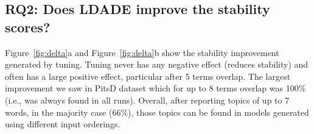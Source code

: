\documentclass[twocolumn,5p,sort&compress]{elsarticle}
\theoremstyle{break}
\begin{document}
\subsection{\textbf{RQ2: Does LDADE improve the stability scores?}}\label{sect:stable}

 Figure~\ref{fig:delta}a and Figure~\ref{fig:delta}b show the stability improvement
 generated by tuning.
   Tuning never
  has any negative effect (reduces stability) and often has a large positive effect,
  particular  after 5 terms overlap.
   The largest improvement  we
   saw  in PitsD dataset which for up to 8 terms overlap was 100\% (i.e., was always
   found in all runs).
   Overall, after reporting topics of up to 7 words, in the majority case (66\%),
  those topics can be found in models generated using different input orderings.
  
\end{document}
